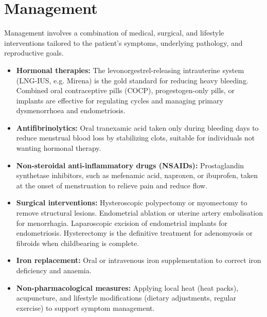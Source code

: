 \section*{Management}
Management involves a combination of medical, surgical, and lifestyle interventions tailored to the patient's symptoms, underlying pathology, and reproductive goals.
\begin{itemize}
    \item \textbf{Hormonal therapies:} The levonorgestrel-releasing intrauterine system (LNG-IUS, e.g. Mirena) is the gold standard for reducing heavy bleeding. Combined oral contraceptive pills (COCP), progestogen-only pills, or implants are effective for regulating cycles and managing primary dysmenorrhoea and endometriosis.
    \item \textbf{Antifibrinolytics:} Oral tranexamic acid taken only during bleeding days to reduce menstrual blood loss by stabilizing clots, suitable for individuals not wanting hormonal therapy.
    \item \textbf{Non-steroidal anti-inflammatory drugs (NSAIDs):} Prostaglandin synthetase inhibitors, such as mefenamic acid, naproxen, or ibuprofen, taken at the onset of menstruation to relieve pain and reduce flow.
    \item \textbf{Surgical interventions:} Hysteroscopic polypectomy or myomectomy to remove structural lesions. Endometrial ablation or uterine artery embolisation for menorrhagia. Laparoscopic excision of endometrial implants for endometriosis. Hysterectomy is the definitive treatment for adenomyosis or fibroids when childbearing is complete.
    \item \textbf{Iron replacement:} Oral or intravenous iron supplementation to correct iron deficiency and anaemia.
    \item \textbf{Non-pharmacological measures:} Applying local heat (heat packs), acupuncture, and lifestyle modifications (dietary adjustments, regular exercise) to support symptom management.
\end{itemize}

